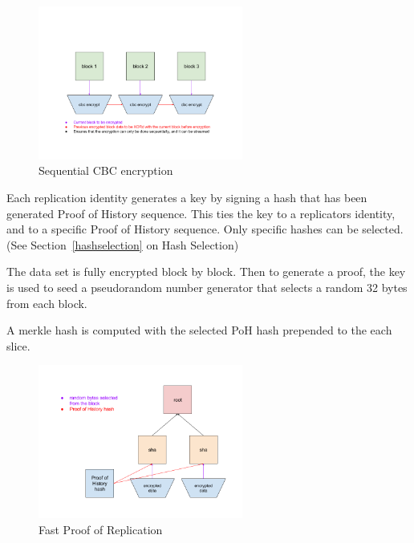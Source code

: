 \documentclass[12pt]{article}
\begin{document}
\begin{figure}
  \begin{center}
    \centering
    \includegraphics[width=0.6\textwidth]{figures/fig_7.png}
    \caption[Fig 7]{Sequential CBC encryption\label{fig:encrypt}}
  \end{center}
  \end{figure}

Each replication identity generates a key by signing a hash that has been generated Proof of History sequence.  This ties the key to a replicators identity, and to a specific Proof of History sequence.  Only specific hashes can be selected.  (See Section~\ref{hashselection} on Hash Selection)

The data set is fully encrypted block by block.  Then to generate a proof, the key is used to seed a pseudorandom number generator that selects a random 32 bytes from each block.

A merkle hash is computed with the selected PoH hash prepended to the each slice.

\begin{figure}
  \begin{center}
    \centering
    \includegraphics[width=0.6\textwidth]{figures/fig_8.png}
    \caption[Fig 8]{Fast Proof of Replication\label{fig_8}}
  \end{center}
  \end{figure}
\end{document}
